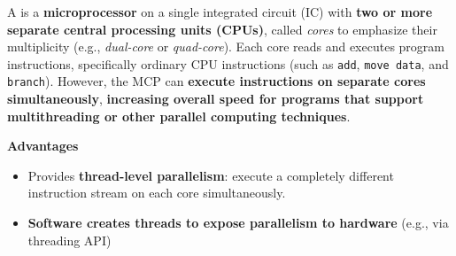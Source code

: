 A  is a \textbf{microprocessor} on a single integrated circuit (IC) with \textbf{two or more separate central processing units (CPUs)}, called \emph{cores} to emphasize their multiplicity (e.g., \emph{dual-core} or \emph{quad-core}). Each core reads and executes program instructions, specifically ordinary CPU instructions (such as \texttt{add}, \texttt{move data}, and \texttt{branch}). However, the MCP can \textbf{execute instructions on separate cores simultaneously}, \textbf{increasing overall speed for programs that support multithreading or other parallel computing techniques}.
\begin{flushleft}
    \textcolor{Green3}{ \textbf{Advantages}}
\end{flushleft}
\begin{itemize}
    \item Provides \textbf{thread-level parallelism}: execute a completely different instruction stream on each core simultaneously.
    \item \textbf{Software creates threads to expose parallelism to hardware} (e.g., via threading API)
\end{itemize}